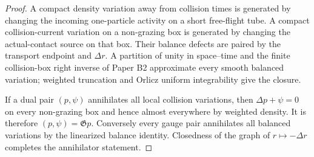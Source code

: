 \begin{proof}
A compact density variation away from collision times is generated by changing
the incoming one-particle activity on a short free-flight tube.  A compact
collision-current variation on a non-grazing box is generated by changing the
actual-contact source on that box.  Their balance defects are paired by the
transport endpoint and \(\Delta r\).  A partition of unity in space--time and
the finite collision-box right inverse of Paper B2 approximate every smooth
balanced variation; weighted truncation and Orlicz uniform integrability give
the closure.

If a dual pair \((p,\psi)\) annihilates all local collision variations, then
\(\Delta p+\psi=0\) on every non-grazing box and hence almost everywhere by
weighted density.  It is therefore \((p,\psi)=\mathfrak Gp\).  Conversely
every gauge pair annihilates all balanced variations by the linearized balance
identity.  Closedness of the graph of \(r\mapsto-\Delta r\) completes the
annihilator statement.
\end{proof}
